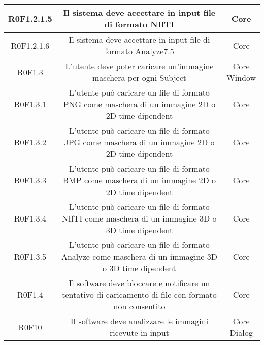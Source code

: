 \begin{center}
\begin{longtable}{|c|c|c|}
\hline
R0F1.2.1.5   & \parbox[t]{\larghezza}{Il sistema deve accettare in input file di formato NIfTI\glossario{}}  & \parbox[t]{\dimFonti}{ Core \\} \\
\hline
R0F1.2.1.6   & \parbox[t]{\larghezza}{Il sistema deve accettare in input file di formato Analyze7.5\glossario{}}  & \parbox[t]{\dimFonti}{ Core \\} \\
\hline
R0F1.3   & \parbox[t]{\larghezza}{L'utente deve poter caricare un'immagine maschera per ogni Subject}  & \parbox[t]{\dimFonti}{ Core \\ Window \\} \\
\hline
R0F1.3.1   & \parbox[t]{\larghezza}{L'utente può caricare un file di formato PNG\glossario{} come maschera di un immagine 2D o 2D time dipendent}  & \parbox[t]{\dimFonti}{ Core \\} \\
\hline
R0F1.3.2   & \parbox[t]{\larghezza}{L'utente può caricare un file di formato JPG come maschera di un immagine 2D o 2D time dipendent}  & \parbox[t]{\dimFonti}{ Core \\} \\
\hline
R0F1.3.3   & \parbox[t]{\larghezza}{L'utente può caricare un file di formato BMP come maschera di un immagine 2D o 2D time dipendent}  & \parbox[t]{\dimFonti}{ Core \\} \\
\hline
R0F1.3.4   & \parbox[t]{\larghezza}{L'utente può caricare un file di formato NIfTI\glossario{} come maschera di un immagine 3D o 3D time dipendent}  & \parbox[t]{\dimFonti}{ Core \\} \\
\hline
R0F1.3.5   & \parbox[t]{\larghezza}{L'utente può caricare un file di formato Analyze\glossario{} come maschera di un immagine 3D o 3D time dipendent}  & \parbox[t]{\dimFonti}{ Core \\} \\
\hline
R0F1.4   & \parbox[t]{\larghezza}{Il software deve bloccare e notificare un tentativo di caricamento di file con formato non consentito}  & \parbox[t]{\dimFonti}{ Core \\} \\
\hline
R0F10   & \parbox[t]{\larghezza}{Il software deve analizzare le immagini ricevute in input}  & \parbox[t]{\dimFonti}{ Core \\ Dialog \\} \\

\end{longtable}
\end{center}
